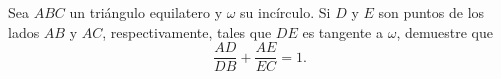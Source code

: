  Sea $ABC$ un triángulo equilatero y $\omega$ su incírculo. Si $D$ y $E$ son puntos de los lados $AB$ y $AC$, respectivamente, tales que $DE$ es tangente a $\omega$, demuestre que 
 \[\frac{AD}{DB}+\frac{AE}{EC}=1.\]